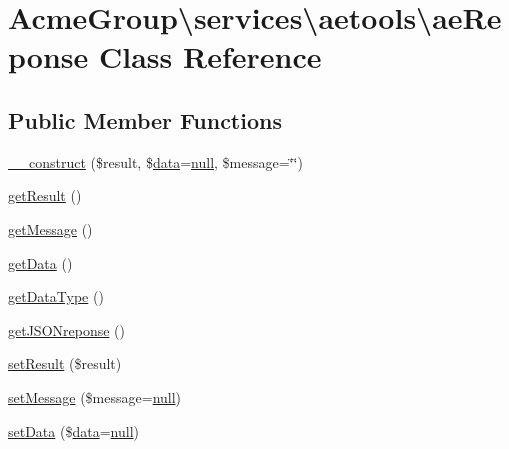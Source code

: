 \hypertarget{class_acme_group_1_1services_1_1aetools_1_1ae_reponse}{\section{Acme\+Group\textbackslash{}services\textbackslash{}aetools\textbackslash{}ae\+Reponse Class Reference}
\label{class_acme_group_1_1services_1_1aetools_1_1ae_reponse}
}
\subsection*{Public Member Functions}
\begin{DoxyCompactItemize}
\item 
\hyperlink{class_acme_group_1_1services_1_1aetools_1_1ae_reponse_a8f7ac136d2081d90591af0bd9a75d8f9}{\+\_\+\+\_\+construct} (\$result, \$\hyperlink{fullpage_2plugin_8js_a718c1bf5a3bf21ebb980203b142e5b75}{data}=\hyperlink{validate_8js_afb8e110345c45e74478894341ab6b28e}{null}, \$message=\char`\"{}\char`\"{})
\item 
\hyperlink{class_acme_group_1_1services_1_1aetools_1_1ae_reponse_aa8c1a77eebfb873ad770b256e452f306}{get\+Result} ()
\item 
\hyperlink{class_acme_group_1_1services_1_1aetools_1_1ae_reponse_a32a34589ff57b560d25338533425ac19}{get\+Message} ()
\item 
\hyperlink{class_acme_group_1_1services_1_1aetools_1_1ae_reponse_a9e7c0d2c9bb179f2c35608c86da991fc}{get\+Data} ()
\item 
\hyperlink{class_acme_group_1_1services_1_1aetools_1_1ae_reponse_a432de880f55ba7eb6b2d45c5366fc7dd}{get\+Data\+Type} ()
\item 
\hyperlink{class_acme_group_1_1services_1_1aetools_1_1ae_reponse_aeaa6c3360b15b049ea312b3a94a655e9}{get\+J\+S\+O\+Nreponse} ()
\item 
\hyperlink{class_acme_group_1_1services_1_1aetools_1_1ae_reponse_a0c9097901e9ae5e74d323f0baa97ce62}{set\+Result} (\$result)
\item 
\hyperlink{class_acme_group_1_1services_1_1aetools_1_1ae_reponse_ab7186789b145f9df8c0e10b97bad0bfc}{set\+Message} (\$message=\hyperlink{validate_8js_afb8e110345c45e74478894341ab6b28e}{null})
\item 
\hyperlink{class_acme_group_1_1services_1_1aetools_1_1ae_reponse_aeeb6130265ab65cef65c1bc1faa35899}{set\+Data} (\$\hyperlink{fullpage_2plugin_8js_a718c1bf5a3bf21ebb980203b142e5b75}{data}=\hyperlink{validate_8js_afb8e110345c45e74478894341ab6b28e}{null})
\end{DoxyCompactItemize}


